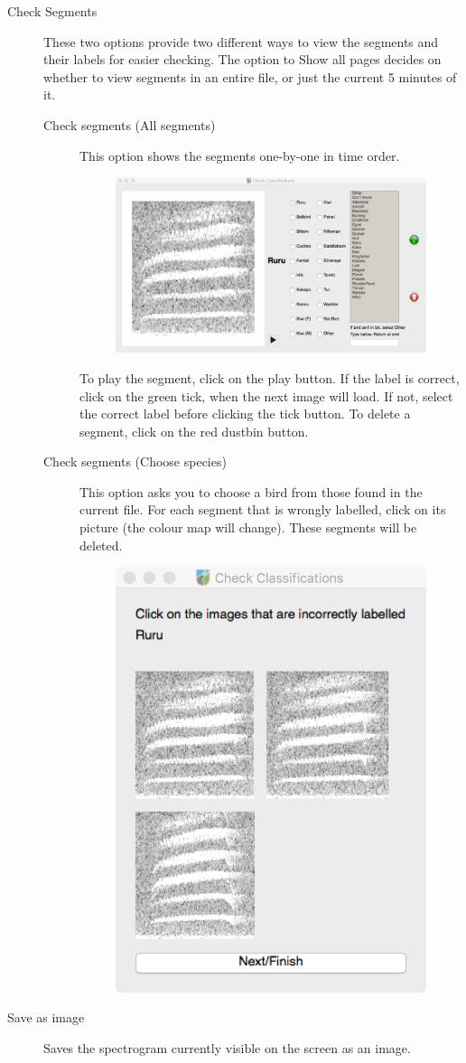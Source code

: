 \documentclass{article}
\begin{document}
\begin{description}
\item [Check Segments] These two options provide two different ways to view the segments and their labels for easier checking. The option to Show all pages decides on whether to view segments in an entire file, or just the current 5 minutes of it. 
	\begin{description}
	\item [Check segments (All segments)] This option shows the segments one-by-one in time order. 
	\begin{figure}
	\centering
	\includegraphics[width=.6\textwidth]{Figs/Check1}
	\end{figure}
	To play the segment, click on the play button. If the label is correct, click on the green tick, when the next image will load. If not, select the correct label before clicking the tick button. To delete a segment, click on the red dustbin button. 
	\item [Check segments (Choose species)] This option asks you to choose a bird from those found in the current file. For each segment that is wrongly labelled, click on its picture (the colour map will change). These segments will be deleted. 
	\begin{figure}
	\centering
	\includegraphics[width=.4\textwidth]{Figs/Check2}
	\end{figure}
	\end{description}

\item [Save as image] Saves the spectrogram currently visible on the screen as an image.
\end{description}
\end{document}
